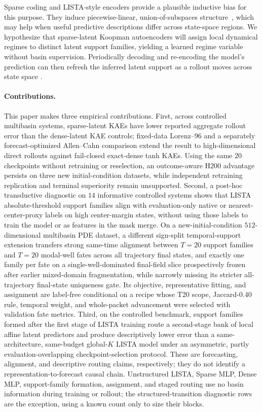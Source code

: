 \documentclass[11pt]{article}
\begin{document}
Sparse coding and LISTA-style encoders provide a plausible inductive bias for this purpose. They induce piecewise-linear, union-of-subspaces structure~\citep{olshausen_emergence_1996,chen_atomic_1998,donoho_optimally_2003,gregor_learning_2010}, which may help when useful predictive descriptions differ across state-space regions.
We hypothesize that sparse-latent Koopman autoencoders will assign local dynamical regimes to distinct latent support families, yielding a learned regime variable without basin supervision.
Periodically decoding and re-encoding the model's prediction can then refresh the inferred latent support as a rollout moves across state space \citep{fathi2024course}.


\paragraph{Contributions.}
This paper makes three empirical contributions. First, across controlled multibasin systems, sparse-latent KAEs have lower reported aggregate rollout error than the dense-latent KAE controls; fixed-data Lorenz--96 and a separately forecast-optimized Allen--Cahn comparison extend the result to high-dimensional direct rollouts against fail-closed exact-dense tanh KAEs. Using the same 20 checkpoints without retraining or reselection, an outcome-aware H200 advantage persists on three new initial-condition datasets, while independent retraining replication and terminal superiority remain unsupported. Second, a post-hoc transductive diagnostic on \(14\) informative controlled systems shows that LISTA absolute-threshold support families align with evaluation-only native or nearest-center-proxy labels on high center-margin states, without using those labels to train the model or as features in the mask merge. On a new-initial-condition \(512\)-dimensional multibasin PDE dataset, a different sign-split temporal-support extension transfers strong same-time alignment between \(T=20\) support families and \(T=20\) modal-well fates across all trajectory final states, and exactly one family per fate on a single-well-dominated final-field slice prospectively frozen after earlier mixed-domain fragmentation, while narrowly missing its stricter all-trajectory final-state uniqueness gate. Its objective, representative fitting, and assignment are label-free conditional on a recipe whose T20 scope, Jaccard-0.40 rule, temporal weight, and whole-packet advancement were selected with validation fate metrics. Third, on the controlled benchmark, support families formed after the first stage of LISTA training route a second-stage bank of local affine latent predictors and produce descriptively lower error than a same-architecture, same-budget global-\(K\) LISTA model under an asymmetric, partly evaluation-overlapping checkpoint-selection protocol. These are forecasting, alignment, and descriptive routing claims, respectively; they do not identify a representation-to-forecast causal chain. Unstructured LISTA, Sparse MLP, Dense MLP, support-family formation, assignment, and staged routing use no basin information during training or rollout; the structured-transition diagnostic rows are the exception, using a known count only to size their blocks.
\end{document}
